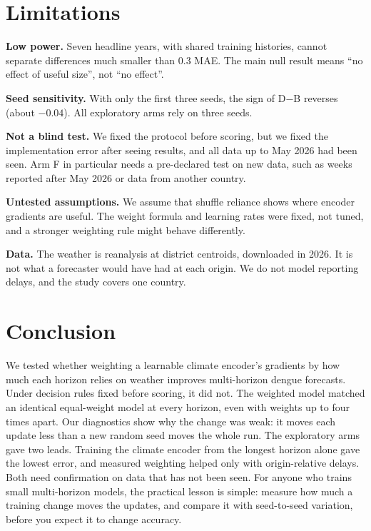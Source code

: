 \documentclass[conference]{IEEEtran}
\begin{document}
\section{Limitations}

\textbf{Low power.} Seven headline years, with shared training histories, cannot separate differences much smaller than 0.3 MAE. The main null result means ``no effect of useful size'', not ``no effect''.

\textbf{Seed sensitivity.} With only the first three seeds, the sign of D$-$B reverses (about $-0.04$). All exploratory arms rely on three seeds.

\textbf{Not a blind test.} We fixed the protocol before scoring, but we fixed the implementation error after seeing results, and all data up to May 2026 had been seen. Arm F in particular needs a pre-declared test on new data, such as weeks reported after May 2026 or data from another country.

\textbf{Untested assumptions.} We assume that shuffle reliance shows where encoder gradients are useful. The weight formula and learning rates were fixed, not tuned, and a stronger weighting rule might behave differently.

\textbf{Data.} The weather is reanalysis at district centroids, downloaded in 2026. It is not what a forecaster would have had at each origin. We do not model reporting delays, and the study covers one country.

\section{Conclusion}

We tested whether weighting a learnable climate encoder's gradients by how much each horizon relies on weather improves multi-horizon dengue forecasts. Under decision rules fixed before scoring, it did not. The weighted model matched an identical equal-weight model at every horizon, even with weights up to four times apart. Our diagnostics show why the change was weak: it moves each update less than a new random seed moves the whole run. The exploratory arms gave two leads. Training the climate encoder from the longest horizon alone gave the lowest error, and measured weighting helped only with origin-relative delays. Both need confirmation on data that has not been seen. For anyone who trains small multi-horizon models, the practical lesson is simple: measure how much a training change moves the updates, and compare it with seed-to-seed variation, before you expect it to change accuracy.




\end{document}
